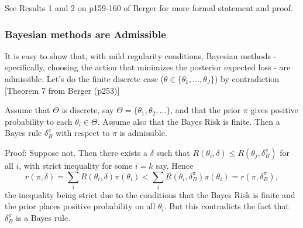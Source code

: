 \documentclass[12pt]{article}
\begin{document}
See Results 1 and 2 on p159-160 of Berger for more formal statement and proof.


\subsubsection{Bayesian methods are Admissible}

It is easy to show that, with mild regularity conditions, Bayesian methods - specifically, choosing
the action that minimizes the posterior expected loss - are admissible.
Let's do the finite discrete case ($\theta \in \{\theta_1,\dots,\theta_J\}$) by contradiction
[Theorem 7 from Berger (p253)]

Assume that $\Theta$ is discrete, say $\Theta = \{\theta_1,\theta_2,\dots\}$, and that the prior
$\pi$ gives positive probability to each $\theta_i \in \Theta$. Assume also that the Bayes Risk is finite. 
Then a Bayes rule $\delta_B^\pi$ with respect to $\pi$
is admissible. 

Proof: Suppose not. Then there exists a $\delta$ such that
$R(\theta_i,\delta) \leq R(\theta_j,\delta_B^\pi)$ for all $i$, with strict inequality for some $i=k$ say.
Hence
\begin{equation}
r(\pi,\delta) = \sum_i R(\theta_i, \delta) \pi(\theta_i) < \sum_i R(\theta_i,\delta_B^\pi) \pi(\theta_i) = r(\pi,\delta_B^\pi),
\end{equation}
the inequality being strict due to the conditions that the Bayes Risk is finite and the prior places positive probability on all $\theta_i$. 
But this contradicts the fact that $\delta_B^\pi$ is a Bayes rule.
\end{document}

